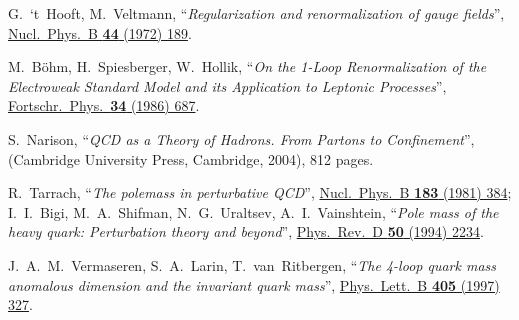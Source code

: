 \begin{thebibliography}{00}
G.~`t~Hooft, M.~Veltmann,
``\textit{Regularization and renormalization of gauge fields}'',\\
\href{http://dx.doi.org/10.1016/0550-3213(72)90279-9}{Nucl.\ Phys.\ B {\bf 44} (1972) 189}.



M.~B\"ohm, H.~Spiesberger, W.~Hollik,
``\textit{On the 1-Loop Renormalization of the Electroweak Standard Model and its Application to Leptonic Processes}'',\\
\href{http://dx.doi.org/10.1002/prop.19860341102}{Fortschr.\ Phys.\ {\bf 34} (1986) 687}.



S.~Narison,
``\textit{QCD as a Theory of Hadrons. From Partons to Confinement}'',
(Cambridge University Press, Cambridge, 2004), 812 pages.



R.~Tarrach,
  ``\textit{The polemass in perturbative QCD}'',
  \href{http://dx.doi.org/10.1016/0550-3213(81)90140-1}{Nucl.\ Phys.\ B {\bf 183} (1981) 384}; \vskip 0.1cm
I.~I.~Bigi, M.~A.~Shifman, N.~G.~Uraltsev, A.~I.~Vainshtein,
  ``\textit{Pole mass of the heavy quark: Perturbation theory and beyond}'',
  \href{http://dx.doi.org/10.1103/PhysRevD.50.2234}{Phys.\ Rev.\ D {\bf 50} (1994) 2234}.





J.~A.~M.~Vermaseren, S.~A.~Larin, T.~van~Ritbergen,
``\textit{The 4-loop quark mass anomalous dimension and the invariant quark mass}'',
\href{http://dx.doi.org/10.1016/S0370-2693(97)00660-6}{Phys.\ Lett.\ B {\bf 405} (1997) 327}.



\end{thebibliography}

